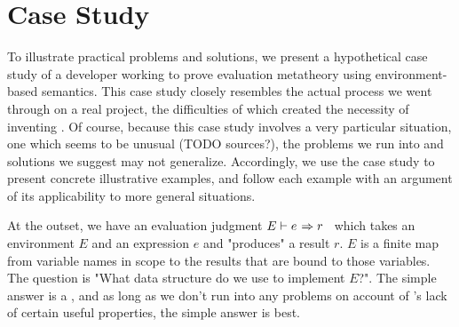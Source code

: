 \section{Case Study}
\label{sec:CaseStudy}
To illustrate practical problems and solutions, we present a hypothetical case study of a developer working to
prove evaluation metatheory using environment-based semantics. This case study closely resembles the actual process we went
through on a real project, the difficulties of which created the necessity of inventing \dds. Of course,
because this case study involves a very particular situation, one which seems to be unusual (TODO sources?),
the problems we run into and solutions we suggest may not generalize. Accordingly, we use the case study to
present concrete illustrative examples, and follow each example with an argument of its applicability to more
general situations.

\newcommand{\eval}[3]{\ensuremath{{#1} \vdash {#2} \hspace{0.01in} \Rightarrow {#3}}}

At the outset, we have an evaluation judgment \eval{E}{e}{r}~ which takes an environment $E$ and an expression $e$
and "produces" a result $r$.
$E$ is a finite map from variable names in scope to the results that are bound to
those variables. The question is "What data structure do we use to implement $E$?". The simple answer is a \sal,
and as long as we don't run into any problems on account of \SAL's lack of certain useful properties, the simple
answer is best.

